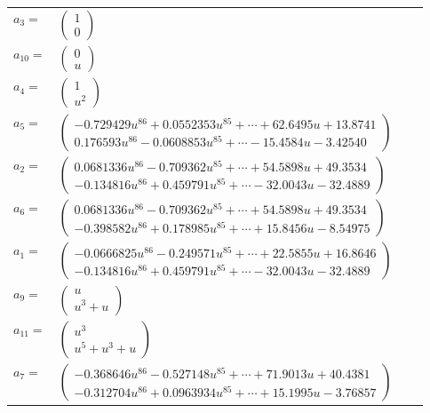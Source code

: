 \documentclass[1p]{elsarticle_modified}
\theoremstyle{definition}
\begin{document}
\begin{tabular}{m{7pt} m{180pt} m{7pt} m{180pt} }
\flushright $a_{3}=$&$\begin{pmatrix}1\\0\end{pmatrix}$ \\
\flushright $a_{10}=$&$\begin{pmatrix}0\\u\end{pmatrix}$ \\
\flushright $a_{4}=$&$\begin{pmatrix}1\\u^2\end{pmatrix}$ \\
\flushright $a_{5}=$&$\begin{pmatrix}-0.729429 u^{86}+0.0552353 u^{85}+\cdots+62.6495 u+13.8741\\0.176593 u^{86}-0.0608853 u^{85}+\cdots-15.4584 u-3.42540\end{pmatrix}$ \\
\flushright $a_{2}=$&$\begin{pmatrix}0.0681336 u^{86}-0.709362 u^{85}+\cdots+54.5898 u+49.3534\\-0.134816 u^{86}+0.459791 u^{85}+\cdots-32.0043 u-32.4889\end{pmatrix}$ \\
\flushright $a_{6}=$&$\begin{pmatrix}0.0681336 u^{86}-0.709362 u^{85}+\cdots+54.5898 u+49.3534\\-0.398582 u^{86}+0.178985 u^{85}+\cdots+15.8456 u-8.54975\end{pmatrix}$ \\
\flushright $a_{1}=$&$\begin{pmatrix}-0.0666825 u^{86}-0.249571 u^{85}+\cdots+22.5855 u+16.8646\\-0.134816 u^{86}+0.459791 u^{85}+\cdots-32.0043 u-32.4889\end{pmatrix}$ \\
\flushright $a_{9}=$&$\begin{pmatrix}u\\u^3+u\end{pmatrix}$ \\
\flushright $a_{11}=$&$\begin{pmatrix}u^3\\u^5+u^3+u\end{pmatrix}$ \\
\flushright $a_{7}=$&$\begin{pmatrix}-0.368646 u^{86}-0.527148 u^{85}+\cdots+71.9013 u+40.4381\\-0.312704 u^{86}+0.0963934 u^{85}+\cdots+15.1995 u-3.76857\end{pmatrix}$ \\

\end{tabular}
\end{document}
